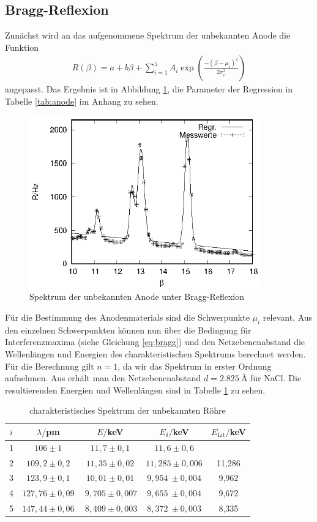 \subsection{Bragg-Reflexion}
Zunächst wird an das aufgenommene Spektrum der unbekannten Anode die Funktion
\begin{align*}
  R(\beta)=a+b\beta+\sum_{i=1}^5 A_i\exp \left(  \frac{-(\beta-\mu_i)^2}{2\sigma_i^2}\right)
\end{align*}
angepasst. Das Ergebnis ist in Abbildung \ref{fig:anode}, die Parameter der Regression in Tabelle \ref{tab:anode} im Anhang zu sehen. 

\begin{figure}[h]
  \centering
  \includegraphics[width=10cm]{data/Bragg/anode.eps}
  \caption{Spektrum der unbekannten Anode unter Bragg-Reflexion}
  \label{fig:anode}
\end{figure}

Für die Bestimmung des Anodenmaterials sind die Schwerpunkte $\mu_i$ relevant. Aus den einzelnen Schwerpunkten können nun über die Bedingung für Interferenzmaxima (siehe Gleichung \ref{eq:bragg}) und den Netzebenenabstand die Wellenlängen und Energien des charakteristischen Spektrums berechnet werden. Für die Berechnung gilt $n=1$, da wir das Spektrum in erster Ordnung aufnehmen. Aus \cite{d_nacl} erhält man den Netzebenenabstand $d=\SI{2,825}{\angstrom}$ für NaCl. Die resultierenden Energien und Wellenlängen sind in Tabelle \ref{tab:spektrum_anode} zu sehen.

\begin{table}[h]
  \centering
  \caption{charakteristisches Spektrum der unbekannten Röhre}
  \label{tab:spektrum_anode}
  \begin{tabular}{c c c c c}
    \toprule
    $i$ & $\lambda/$pm & $E/$keV & $E_\delta/$keV & $E_\mathrm{Lit}/$keV\\
    \midrule
    1   & $106 \pm 1$ & $11,7 \pm 0,1$ & $11,6 \pm 0,6$ & \\
    2   & $109,2 \pm 0,2$ & $11,35 \pm 0,02$ & $11,285 \pm 0,006$ & 11,286\\
    3   & $123,9 \pm 0,1$ & $10,01 \pm 0,01$ & $9,954 \ \pm 0,004$ & 9,962\\
    4   & $127,76 \pm 0,09$ & $\ 9,705 \pm 0,007$ & $9,655 \ \pm 0,004$ & 9,672\\
    5   & $147,44 \pm 0,06$ & $\ 8,409 \pm 0,003$ & $8,372 \ \pm 0,003$ & 8,335\\
    \bottomrule
  \end{tabular}
\end{table}

